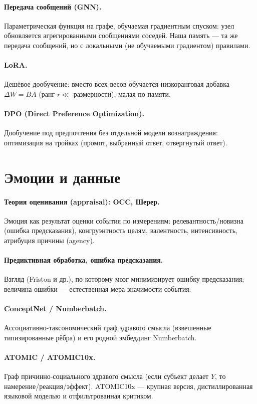 \paragraph{Передача сообщений (GNN).} Параметрическая функция на графе, обучаемая
градиентным спуском: узел обновляется агрегированными сообщениями соседей. Наша
память — та же передача сообщений, но с локальными (не обучаемыми градиентом)
правилами.

\paragraph{LoRA.} Дешёвое дообучение: вместо всех весов обучается низкоранговая
добавка $\Delta W=BA$ (ранг $r\ll$ размерности), малая по памяти.

\paragraph{DPO (Direct Preference Optimization).} Дообучение под предпочтения без
отдельной модели вознаграждения: оптимизация на тройках (промпт, выбранный ответ,
отвергнутый ответ).

\section*{Эмоции и данные}

\paragraph{Теория оценивания (appraisal): OCC, Шерер.} Эмоция как результат оценки
события по измерениям: релевантность/новизна (ошибка предсказания), конгруэнтность
целям, валентность, интенсивность, атрибуция причины (agency).

\paragraph{Предиктивная обработка, ошибка предсказания.} Взгляд (Friston и др.), по
которому мозг минимизирует ошибку предсказания; величина ошибки — естественная мера
значимости события.

\paragraph{ConceptNet / Numberbatch.} Ассоциативно-таксономический граф здравого
смысла (взвешенные типизированные рёбра) и его родной эмбеддинг Numberbatch.

\paragraph{ATOMIC / ATOMIC10x.} Граф причинно-социального здравого смысла (если
субъект делает $Y$, то намерение/реакция/эффект). ATOMIC10x — крупная версия,
дистиллированная языковой моделью и отфильтрованная критиком.

